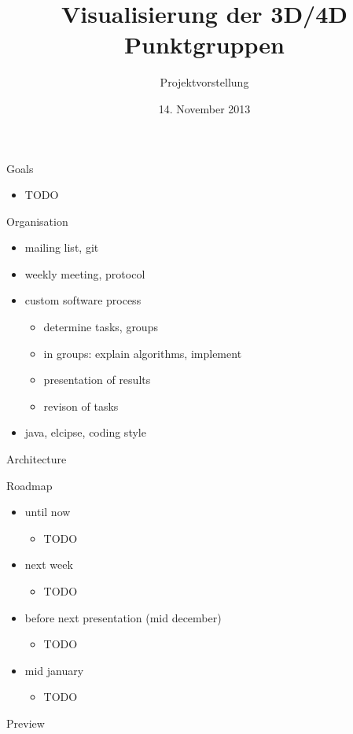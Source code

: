 \documentclass[ucs,11pt]{beamer}
\title[Punktgruppen]{Visualisierung der 3D/4D Punktgruppen}
\subtitle{Projektvorstellung}
\institute[FU Berlin]{Freie Universität Berlin}
\date[14.11.2013]{14. November 2013}
\begin{document}
\begin{frame}[plain]
	\titlepage
\end{frame}

\begin{frame}{Goals}
	\begin{itemize}
	\item TODO
	\end{itemize}
\end{frame}

\begin{frame}{Organisation}
  \begin{itemize}
    \item mailing list, git
    \item weekly meeting, protocol
    \item custom software process
      \begin{itemize}
        \item determine tasks, groups
        \item in groups: explain algorithms, implement
        \item presentation of results
        \item revison of tasks
      \end{itemize}
    \item java, elcipse, coding style
  \end{itemize}
\end{frame}

\begin{frame}{Architecture}
\end{frame}

\begin{frame}{Roadmap}
  \begin{itemize}
    \item until now
      \begin{itemize}
        \item TODO
      \end{itemize}
      \item next week
      \begin{itemize}
        \item TODO
      \end{itemize}
      \item before next presentation (mid december)
        \begin{itemize}
          \item TODO
        \end{itemize}
      \item mid january
        \begin{itemize}
          \item TODO
        \end{itemize}
  \end{itemize}
\end{frame}

\begin{frame}{Preview}
\end{frame}
\end{document}
